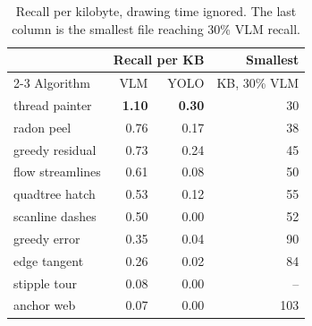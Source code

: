 \begin{table}[t]
\centering
\caption{Recall per kilobyte, drawing time ignored. The last column is the smallest file reaching 30\% VLM recall.}
\label{tab:size-only}
\footnotesize
\setlength{\tabcolsep}{4pt}
\begin{tabular}{lrrr}
\toprule
 & \multicolumn{2}{c}{Recall per KB} & Smallest \\
\cmidrule(lr){2-3}
Algorithm & VLM & YOLO & KB, 30\% VLM \\
\midrule
thread painter & \textbf{1.10} & \textbf{0.30} & 30 \\
radon peel & 0.76 & 0.17 & 38 \\
greedy residual & 0.73 & 0.24 & 45 \\
flow streamlines & 0.61 & 0.08 & 50 \\
quadtree hatch & 0.53 & 0.12 & 55 \\
scanline dashes & 0.50 & 0.00 & 52 \\
greedy error & 0.35 & 0.04 & 90 \\
edge tangent & 0.26 & 0.02 & 84 \\
stipple tour & 0.08 & 0.00 & -- \\
anchor web & 0.07 & 0.00 & 103 \\
\bottomrule
\end{tabular}
\end{table}
